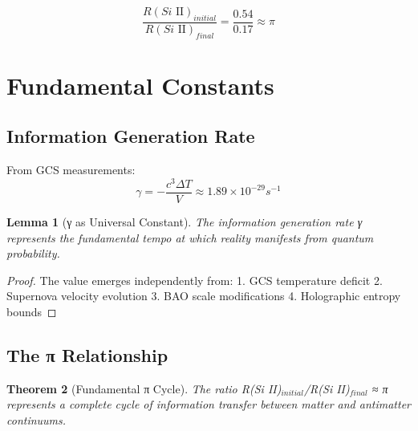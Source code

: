 \documentclass{article}
\newtheorem{theorem}{Theorem}
\newtheorem{lemma}[theorem]{Lemma}
\begin{document}
\begin{equation}
\frac{R(Si\text{ II})_{initial}}{R(Si\text{ II})_{final}} = \frac{0.54}{0.17} \approx \pi
\end{equation}

\section{Fundamental Constants}

\subsection{Information Generation Rate}

From GCS measurements:
\begin{equation}
\gamma = -\frac{c^3\Delta T}{V} \approx 1.89 \times 10^{-29} s^{-1}
\end{equation}

\begin{lemma}[γ as Universal Constant]
The information generation rate γ represents the fundamental tempo at which reality manifests from quantum probability.
\end{lemma}

\begin{proof}
The value emerges independently from:
1. GCS temperature deficit
2. Supernova velocity evolution
3. BAO scale modifications
4. Holographic entropy bounds
\end{proof}

\subsection{The π Relationship}

\begin{theorem}[Fundamental π Cycle]
The ratio R(Si II)$_{initial}$/R(Si II)$_{final}$ ≈ π represents a complete cycle of information transfer between matter and antimatter continuums.
\end{theorem}
\end{document}

